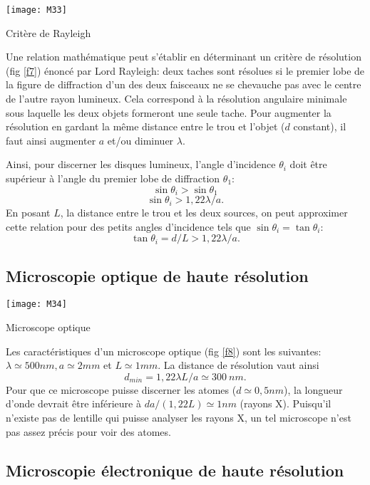 \begin{marginfigure}[0cm]
\texttt{[image: M33]}
\caption{Critère de Rayleigh}
\label{f7}
\end{marginfigure}

\noindent Une relation mathématique peut s'établir en déterminant un critère de résolution (fig \ref{f7}) énoncé par Lord Rayleigh: deux taches sont résolues si le premier lobe de la figure de diffraction d'un des deux faisceaux ne se chevauche pas avec le centre de l'autre rayon lumineux. Cela correspond à la résolution angulaire minimale sous laquelle les deux objets formeront une seule tache. Pour augmenter la résolution en gardant la même distance entre le trou et l'objet ($d$ constant), il faut ainsi augmenter $a$ et/ou diminuer $\lambda$.

\noindent Ainsi, pour discerner les disques lumineux, l'angle d'incidence $\theta_i$ doit être supérieur à l'angle du premier lobe de diffraction $\theta_1$:
$$
    \sin\theta_i>\sin\theta_1
$$
$$
    \sin\theta_i>1,22\lambda/a.
$$
En posant $L$, la distance entre le trou et les deux sources, on peut approximer cette relation pour des petits angles d'incidence tels que $\sin\theta_i=\tan \theta_i$:
$$
    \tan\theta_i=d/L>1,22\lambda/a.
$$

\subsection{Microscopie optique de haute résolution}

\begin{marginfigure}[-1.5cm]
\texttt{[image: M34]}
\caption{Microscope optique}
\label{f8}
\end{marginfigure}

Les caractéristiques d'un microscope optique (fig \ref{f8}) sont les suivantes: $\lambda\simeq500nm,a\simeq2mm$ et $L\simeq1mm$. La distance de résolution vaut ainsi 
$$
d_{min}=1,22\lambda L/a\simeq300\:nm.
$$
Pour que ce microscope puisse discerner les atomes ($d\simeq0,5nm$), la longueur d'onde devrait être inférieure à $da/(1,22L)\simeq1nm$ (rayons X). Puisqu'il n'existe pas de lentille qui puisse analyser les rayons X, un tel microscope n'est pas assez précis pour voir des atomes.

\subsection{Microscopie électronique de haute résolution}

